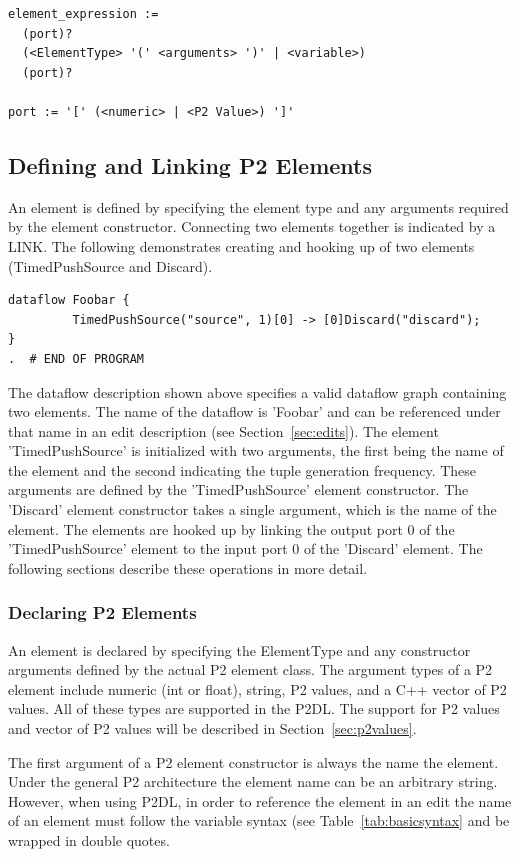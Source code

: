 \documentclass[12pt]{article}
\begin{document}
\begin{verbatim}
element_expression := 
  (port)? 
  (<ElementType> '(' <arguments> ')' | <variable>) 
  (port)?

port := '[' (<numeric> | <P2 Value>) ']'
\end{verbatim}


\subsection{Defining and Linking P2 Elements}
An element is defined by specifying the element type and any arguments required 
by the element constructor. Connecting two elements together is indicated by a LINK. 
The following demonstrates creating and hooking up of two elements (TimedPushSource
and Discard).

\begin{verbatim}
dataflow Foobar {
         TimedPushSource("source", 1)[0] -> [0]Discard("discard");
}
.  # END OF PROGRAM
\end{verbatim}

The dataflow description shown above specifies a valid dataflow graph containing
two elements. The name of the dataflow is 'Foobar' and can be referenced under that
name in an edit description (see Section~\ref{sec:edits}). The element 'TimedPushSource' 
is initialized with two arguments, the first being the name of the element and the second 
indicating the tuple generation frequency. These arguments are defined by the 
'TimedPushSource' element constructor.
The 'Discard' element constructor takes a single argument, which is the name of the
element. The elements are hooked up by linking the output port 0 of the 
'TimedPushSource' element to the input port 0 of the 'Discard' element. The following
sections describe these operations in more detail.

\subsubsection{Declaring P2 Elements}

An element is declared by specifying the ElementType and any constructor arguments
defined by the actual P2 element class. The argument types of a P2 element include
numeric (int or float), string, P2 values, and a C++ vector of P2 values. All of these types
are supported in the P2DL. The support for P2 values and vector of P2 values will be described in 
Section~\ref{sec:p2values}. 

The first argument of a P2 element constructor is always the name the element. 
Under the general P2 architecture the element name can be
an arbitrary string. However, when using P2DL, in order to reference the element in an
edit the name of an element must follow the variable syntax (see Table~\ref{tab:basicsyntax} 
and be wrapped in double quotes.
\end{document}
